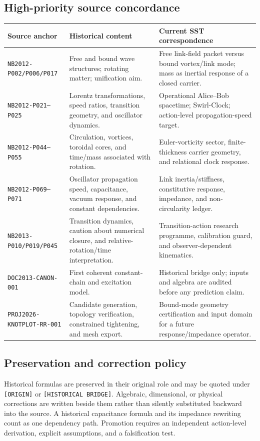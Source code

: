 \documentclass[11pt]{article}
\theoremstyle{definition}
\theoremstyle{plain}
\theoremstyle{remark}
\begin{document}
    \subsection{High-priority source concordance}
    \begin{center}
    \begin{tabularx}{0.96\textwidth}{@{}p{}p{}X@{}}
    \toprule
    Source anchor & Historical content & Current SST correspondence \\
    \midrule
    \texttt{NB2012-P002/P006/P017} & Free and bound wave structures; rotating matter; unification aim. & Free link-field packet versus bound vortex/link mode; mass as inertial response of a closed carrier. \\
    \texttt{NB2012-P021--P025} & Lorentz transformations, speed ratios, transition geometry, and oscillator dynamics. & Operational Alice--Bob spacetime; Swirl-Clock; action-level propagation-speed target. \\
    \texttt{NB2012-P044--P055} & Circulation, vortices, toroidal cores, and time/mass associated with rotation. & Euler-vorticity sector, finite-thickness carrier geometry, and relational clock response. \\
    \texttt{NB2012-P069--P071} & Oscillator propagation speed, capacitance, vacuum response, and constant dependencies. & Link inertia/stiffness, constitutive response, impedance, and non-circularity ledger. \\
    \texttt{NB2013-P010/P019/P045} & Transition dynamics, caution about numerical closure, and relative-rotation/time interpretation. & Transition-action research programme, calibration guard, and observer-dependent kinematics. \\
    \texttt{DOC2013-CANON-001} & First coherent constant-chain and excitation model. & Historical bridge only; inputs and algebra are audited before any prediction claim. \\
    \texttt{PROJ2026-KNOTPLOT-RR-001} & Candidate generation, topology verification, constrained tightening, and mesh export. & Bound-mode geometry certification and input domain for a future response/impedance operator. \\
    \bottomrule
    \end{tabularx}
    \end{center}

    \subsection{Preservation and correction policy}
    Historical formulas are preserved in their original role and may be quoted
    under \texttt{[ORIGIN]} or \texttt{[HISTORICAL BRIDGE]}. Algebraic,
    dimensional, or physical corrections are written beside them rather than
    silently substituted backward into the source.  A historical capacitance
    formula and its impedance rewriting count as one dependency path.  Promotion
    requires an independent action-level derivation, explicit assumptions, and a
    falsification test.
\end{document}
